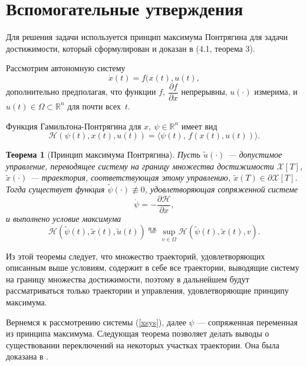 \documentclass[16pt]{article}
\newtheorem{Th}{Теорема}
\newcommand\Real{\mathbb{R}}
\newcommand\A{(\cdot)}
\newcommand\Scal[2]{\langle #1,\, #2 \rangle}
\newcommand\X{\mathcal{X}}
\begin{document}
\section{Вспомогательные утверждения}
Для решения задачи используется принцип максимума Понтрягина для задачи достижимости, который сформулирован и 
доказан в \cite{LiMarkus} (4.1, теорема 3).

Рассмотрим автономную систему
$$ \dot x(t) = f(x(t), u(t),$$
дополнительно предполагая, что функции $f, \ \dfrac{\partial f}{\partial x}$ непрерывны, $u\A$ измерима, и 
$u(t) \in \Omega \subset \Real^n$ для почти всех~$t$.

Функция Гамильтона-Понтрягина для $x,\ \psi \in \Real^n$ имеет вид
$$\mathcal{H}(\psi(t), x(t), u(t)) = \Scal{\psi(t)}{f(x(t), u(t))}.$$
\begin{Th}[Принцип максимума Понтрягина]
Пусть $\tilde u\A$ --- допустимое управление, переводящее систему на границу множества достижимости $\X[T]$,
$\tilde x\A$ --- траектория, соответствующая этому управлению, $\tilde x(T) \in \partial \X[T]$. Тогда существует
функция
$\tilde \psi\A  \not\equiv 0$, удовлетворяющая сопряженной системе
$$ \dot \psi = -\dfrac{\partial \mathcal{H}}{\partial x},$$
и выполнено условие максимума
$$\mathcal{H}(\tilde \psi(t), \tilde x(t), \tilde u(t)) \overset{\text{п.в.}}{=} \sup_{v \in \Omega} \mathcal{H}(\tilde \psi(t), \tilde x(t),v).$$
\end{Th}

Из этой теоремы следует, что множество траекторий, удовлетворяющих описанным выше условиям, содержит в себе
все траектории, выводящие систему на границу множества достижимости, поэтому в дальнейшем будут рассматриваться
только траектории и управления, удовлетворяющие принципу максимума.

Вернемся к рассмотрению системы (\ref{xsys}), далее $\psi$ --- сопряженная переменная
из принципа максимума.
Следующая теорема позволяет делать выводы о существовании переключений на некоторых участках траектории.
Она была доказана в \cite{OC}. 
\end{document}
